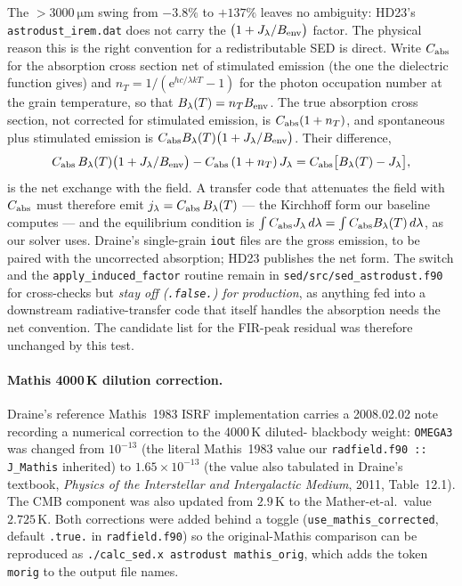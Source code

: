 \documentclass{my_memo}
\begin{document}
The $>\SI{3000}{\micro\meter}$ swing from $-3.8\%$ to $+137\%$ leaves
no ambiguity: HD23's \texttt{astrodust\_irem.dat} does not carry the
$\bigl(1 + J_\lambda/B_{\rm env}\bigr)$ factor. The physical reason
this is the right convention for a redistributable SED is direct.
Write $C_{\rm abs}$ for the absorption cross section net of stimulated
emission (the one the dielectric function gives) and
$n_T = 1/(\mathrm{e}^{hc/\lambda kT}-1)$ for the photon occupation
number at the grain temperature, so that
$B_\lambda(T) = n_T B_{\rm env}$. The true absorption cross section,
not corrected for stimulated emission, is $C_{\rm abs}(1+n_T)$, and
spontaneous plus stimulated emission is
$C_{\rm abs}B_\lambda(T)\bigl(1 + J_\lambda/B_{\rm env}\bigr)$.
Their difference,
\[
C_{\rm abs}\,B_\lambda(T)\bigl(1 + J_\lambda/B_{\rm env}\bigr)
 - C_{\rm abs}\,(1+n_T)\,J_\lambda
 = C_{\rm abs}\bigl[B_\lambda(T) - J_\lambda\bigr],
\]
is the net exchange with the field. A transfer code that attenuates the
field with $C_{\rm abs}$ must therefore emit
$j_\lambda = C_{\rm abs}\,B_\lambda(T)$ --- the Kirchhoff form our
baseline computes --- and the equilibrium condition is
$\int C_{\rm abs} J_\lambda\,d\lambda = \int C_{\rm abs} B_\lambda(T)\,
d\lambda$, as our solver uses. Draine's single-grain \texttt{iout}
files are the gross emission, to be paired with the uncorrected
absorption; HD23 publishes the net form. The switch and the
\texttt{apply\_induced\_factor} routine remain in
\texttt{sed/src/sed\_astrodust.f90} for cross-checks but
\emph{stay off (\texttt{.false.}) for production}, as anything fed into
a downstream radiative-transfer code that itself handles the
absorption needs the net convention. The candidate list for the
FIR-peak residual was therefore unchanged by this test.

\paragraph{Mathis 4000\,K dilution correction.} Draine's reference
Mathis~1983 ISRF implementation carries a 2008.02.02
note recording a numerical correction to the 4000\,K diluted-
blackbody weight: \texttt{OMEGA3} was changed from $10^{-13}$ (the
literal Mathis~1983 value our \texttt{radfield.f90 :: J\_Mathis}
inherited) to $1.65\times 10^{-13}$ (the value also tabulated in
Draine's textbook, \emph{Physics of the Interstellar and
Intergalactic Medium}, 2011, Table~12.1). The CMB component was
also updated from $2.9$\,K to the Mather-et-al.\ value $2.725$\,K.
Both corrections were added behind a toggle
(\texttt{use\_mathis\_corrected}, default \texttt{.true.} in
\texttt{radfield.f90}) so the original-Mathis comparison
can be reproduced as \texttt{./calc\_sed.x astrodust mathis\_orig}, which
adds the token \texttt{morig} to the output file names.
\end{document}
